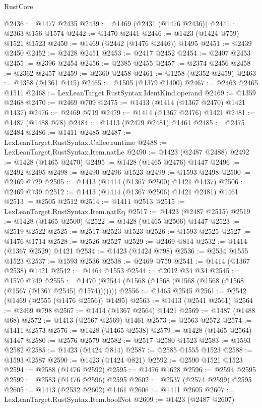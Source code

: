 \begin{lexlean}{RustCore}
\begin{coremodule}
@2436 := @1477 @2435
@2439 := @1469 (@2431 (@1476 @2436))
@2441 := @2363 @156 @1574
@2442 := @1470 @2441
@2446 := @1423 (@1424 @759) @1521 @1523
@2450 := @1469 (@2442 (@1476 @2446)) @1495
@2451 := @2439 @2450
@2452 := @2428 @2451
@2453 := @2417 @2452
@2454 := @2407 @2453
@2455 := @2396 @2454
@2456 := @2385 @2455
@2457 := @2374 @2456
@2458 := @2362 @2457
@2459 := @2360 @2458
@2461 := @1258 (@2352 @2459)
@2463 := @1358 (@1361 @445)
@2465 := @1505 (@1379 @1400)
@2467 := @2463 @2465 @1511
@2468 := LexLeanTarget.RustSyntax.IdentKind.operand
@2469 := @1359 @2468
@2470 := @2469 @709
@2475 := @1413 (@1414 (@1367 @2470) @1421 @1437)
@2476 := @2469 @719
@2479 := @1414 (@1367 @2476) @1421
@2481 := @1487 (@1488 @78)
@2484 := @1413 (@2479 @2481) @1461
@2485 := @2475 @2484
@2486 := @1411 @2485
@2487 := LexLeanTarget.RustSyntax.Callee.runtime
@2488 := LexLeanTarget.RustSyntax.Item.natLe
@2490 := @1423 (@2487 @2488)
@2492 := @1428 (@1465 @2470)
@2495 := @1428 (@1465 @2476) @1447
@2496 := @2492 @2495
@2498 := @2490 @2496 @1523
@2499 := @1593 @2498
@2500 := @2469 @729
@2505 := @1413 (@1414 (@1367 @2500) @1421 @1437)
@2506 := @2469 @739
@2512 := @1413 (@1414 (@1367 @2506) @1421 @2481) @1461
@2513 := @2505 @2512
@2514 := @1411 @2513
@2515 := LexLeanTarget.RustSyntax.Item.natEq
@2517 := @1423 (@2487 @2515)
@2519 := @1428 (@1465 @2500)
@2522 := @1428 (@1465 @2506) @1447
@2523 := @2519 @2522
@2525 := @2517 @2523 @1523
@2526 := @1593 @2525
@2527 := @1476 @1714
@2528 := @2526 @2527
@2529 := @2469 @814
@2532 := @1414 (@1367 @2529) @1421
@2534 := @1423 (@1424 @798)
@2536 := @2534 @1555 @1523
@2537 := @1593 @2536
@2538 := @2469 @759
@2541 := @1414 (@1367 @2538) @1421
@2542 := @1464 @1553
@2544 := @2012 @34 @34
@2545 := @1570 @749
@2555 := @1470 (@2544 (@1568 (@1568 (@1568 (@1568 (@1568 (@1567 (@1367 @2545) @1574)))))))
@2556 := @1465 @2545
@2561 := @2542 (@1469 (@2555 (@1476 @2556)) @1495)
@2563 := @1413 (@2541 @2561)
@2564 := @2469 @798
@2567 := @1414 (@1367 @2564) @1421
@2569 := @1487 (@1488 @68)
@2572 := @1413 (@2567 @2569) @1461
@2573 := @2563 @2572
@2574 := @1411 @2573
@2576 := @1428 (@1465 @2538)
@2579 := @1428 (@1465 @2564) @1447
@2580 := @2576 @2579
@2582 := @2517 @2580 @1523
@2583 := @1593 @2582
@2585 := @1423 (@1424 @814)
@2587 := @2585 @1555 @1523
@2588 := @1593 @2587
@2590 := @1423 (@1424 @821)
@2592 := @2590 @1521 @1523
@2594 := @2588 (@1476 @2592)
@2595 := @1476 @1628
@2596 := @2594 @2595
@2599 := @2583 (@1476 @2596) @2595
@2602 := @2537 (@2574 @2599) @2595
@2605 := @1413 (@2532 @2602) @1461
@2606 := @1411 @2605
@2607 := LexLeanTarget.RustSyntax.Item.boolNot
@2609 := @1423 (@2487 @2607)

\end{coremodule}
\end{lexlean}
